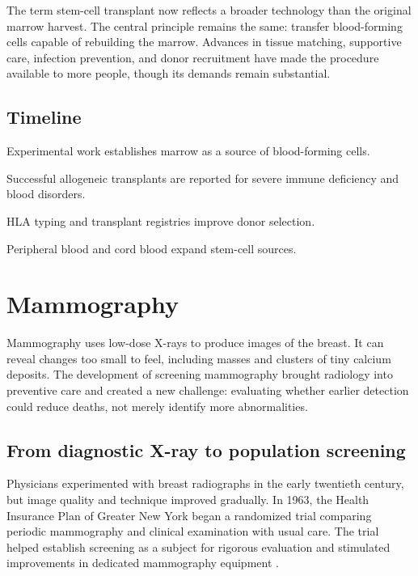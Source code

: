 \documentclass[12pt,oneside]{book}
\begin{document}
The term stem-cell transplant now reflects a broader technology than the
original marrow harvest. The central principle remains the same: transfer
blood-forming cells capable of rebuilding the marrow. Advances in tissue
matching, supportive care, infection prevention, and donor recruitment have
made the procedure available to more people, though its demands remain
substantial.

\section*{Timeline}
\begin{description}[leftmargin=2.3cm,style=nextline]
  \item[1950s] Experimental work establishes marrow as a source of blood-forming cells.
  \item[1968] Successful allogeneic transplants are reported for severe immune deficiency and blood disorders.
  \item[1970s] HLA typing and transplant registries improve donor selection.
  \item[1980s onward] Peripheral blood and cord blood expand stem-cell sources.
\end{description}
\chapter[Mammography]{Mammography}

Mammography uses low-dose X-rays to produce images of the breast. It can
reveal changes too small to feel, including masses and clusters of tiny
calcium deposits. The development of screening mammography brought radiology
into preventive care and created a new challenge: evaluating whether earlier
detection could reduce deaths, not merely identify more abnormalities.

\section{From diagnostic X-ray to population screening}
Physicians experimented with breast radiographs in the early twentieth century, but image quality and technique improved gradually. In 1963, the Health Insurance Plan of Greater New York began a randomized trial comparing periodic mammography and clinical examination with usual care. The trial helped establish screening as a subject for rigorous evaluation and stimulated improvements in dedicated mammography equipment \cite{hipMammographyTrial,nciBreastScreening}.
\end{document}
